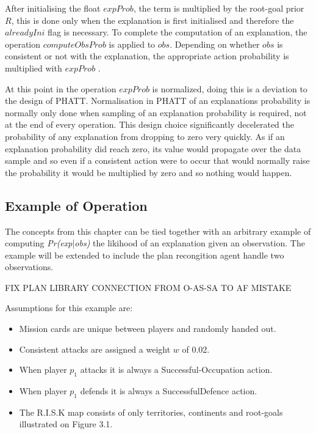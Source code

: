 \documentclass[parskip]{cs4rep}
\begin{document}
After initialising the float $expProb$, the term is multiplied by the root-goal prior $R$, this is done only when the explanation is first initialised and therefore the $alreadyIni$ flag is necessary. To complete the computation of an explanation, the operation $computeObsProb$ is applied to $obs$. Depending on whether $obs$ is consistent or not with the explanation, the appropriate action probability is multiplied with $expProb$ .

At this point in the operation $expProb$ is normalized, doing this is a deviation to the design of PHATT. Normalisation in PHATT of an explanations probability is normally only done when sampling of an explanation probability is required, not at the end of every operation. This design choice significantly decelerated the probability of any explanation from dropping to zero very quickly. As if an explanation probability did reach zero, its value would propagate over the data sample and so even if a consistent action were to occur that would normally raise the probability it would be multiplied by zero and so nothing would happen. 

\subsection{Example of Operation}

The concepts from this chapter can be tied together with an arbitrary example of computing \textit{Pr(exp}|\textit{obs)} the likihood of an explanation given an observation. The example will be extended to include the plan recongition agent handle two observations.


FIX PLAN LIBRARY CONNECTION FROM O-AS-SA TO AF MISTAKE

Assumptions for this example are:

\begin{itemize}
\item
Mission cards are unique between players and randomly handed out.
\item
Consistent attacks are assigned a weight $w$ of 0.02.
\item
When player $p_1$ attacks it is always a Successful-Occupation action.
\item
When player $p_1$ defends it is always a SuccessfulDefence action.
\item
The R.I.S.K map consists of only territories, continents and root-goals illustrated on Figure 3.1.
\end{itemize}
\end{document}

